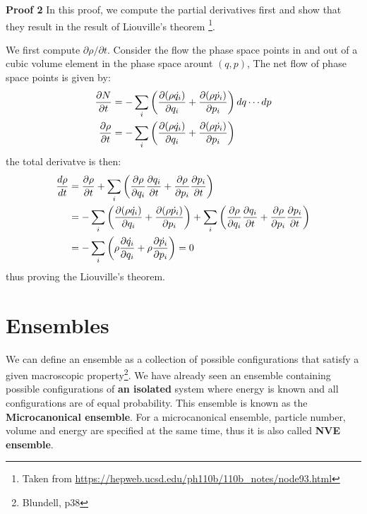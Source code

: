 \documentclass{article}
\begin{document}
\textbf{Proof 2} In this proof, we compute the partial derivatives first and show that they result in the result of Liouville's theorem
\footnote{Taken from \url{https://hepweb.ucsd.edu/ph110b/110b_notes/node93.html}}.

We first compute $\partial \rho / \partial t$. Consider the flow the phase space points in and out of a cubic volume element 
in the phase space arount $(q,p)$, The net flow of phase space points is given by:
\begin{align}
    \frac{\partial N}{\partial t} 
    &= -\sum_i \left( \frac{\partial (\rho \dot{q_i})}{\partial q_i} + \frac{\partial (\rho \dot{p_i})}{\partial p_i} \right) dq \cdots dp \notag \\
    \frac{\partial \rho}{\partial t} 
    &= -\sum_i \left( \frac{\partial (\rho \dot{q_i})}{\partial q_i} + \frac{\partial (\rho \dot{p_i})}{\partial p_i} \right)
\end{align}
the total derivatve is then:
\begin{align}
    \frac{d\rho}{dt} &= \frac{\partial \rho}{\partial t}
    + \sum_i \left( \frac{\partial \rho}{\partial q_i}\frac{\partial q_i}{\partial t} + \frac{\partial \rho}{\partial p_i}\frac{\partial p_i}{\partial t} \right) \notag \\
    &= -\sum_i \left( \frac{\partial (\rho \dot{q_i})}{\partial q_i} + \frac{\partial (\rho \dot{p_i})}{\partial p_i} \right) 
    + \sum_i \left( \frac{\partial \rho}{\partial q_i}\frac{\partial q_i}{\partial t} + \frac{\partial \rho}{\partial p_i}\frac{\partial p_i}{\partial t} \right) \notag \\
    &= - \sum_i \left( \rho\frac{\partial \dot{q_i}}{\partial q_i} + \rho\frac{\partial \dot{p_i}}{\partial p_i}  \right) = 0
\end{align}
thus proving the Liouville's theorem.


\section{Ensembles}
We can define an ensemble as a collection of possible configurations that satisfy a given macroscopic 
property\footnote{Blundell, p38}.
We have already seen an ensemble containing possible configurations of \textbf{an isolated} system where energy
is known and all configurations are of equal probability. 
This ensemble is known as the \textbf{Microcanonical ensemble}. For a microcanonical ensemble, particle 
number, volume and energy are specified at the same time, thus it is also called \textbf{NVE ensemble}.
\end{document}
